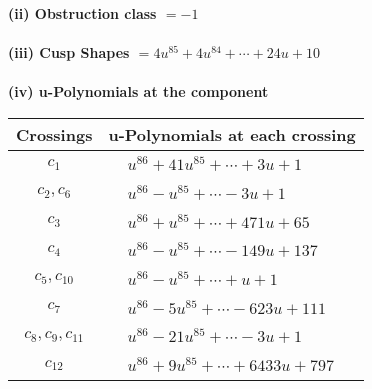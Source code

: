 \documentclass[1p]{elsarticle_modified}
\theoremstyle{definition}
\begin{document}
\flushleft \textbf{(ii) Obstruction class $= -1$}\\~\\
\flushleft \textbf{(iii) Cusp Shapes $= 4 u^{85}+4 u^{84}+\cdots+24 u+10$}\\~\\
\newpage\renewcommand{\arraystretch}{1}
\flushleft \textbf{(iv) u-Polynomials at the component}\newline \\
\begin{tabular}{m{50pt}|m{274pt}}
Crossings & \hspace{64pt}u-Polynomials at each crossing \\
\hline $$\begin{aligned}c_{1}\end{aligned}$$&$\begin{aligned}
&u^{86}+41 u^{85}+\cdots+3 u+1
\end{aligned}$\\
\hline $$\begin{aligned}c_{2},c_{6}\end{aligned}$$&$\begin{aligned}
&u^{86}- u^{85}+\cdots-3 u+1
\end{aligned}$\\
\hline $$\begin{aligned}c_{3}\end{aligned}$$&$\begin{aligned}
&u^{86}+u^{85}+\cdots+471 u+65
\end{aligned}$\\
\hline $$\begin{aligned}c_{4}\end{aligned}$$&$\begin{aligned}
&u^{86}- u^{85}+\cdots-149 u+137
\end{aligned}$\\
\hline $$\begin{aligned}c_{5},c_{10}\end{aligned}$$&$\begin{aligned}
&u^{86}- u^{85}+\cdots+u+1
\end{aligned}$\\
\hline $$\begin{aligned}c_{7}\end{aligned}$$&$\begin{aligned}
&u^{86}-5 u^{85}+\cdots-623 u+111
\end{aligned}$\\
\hline $$\begin{aligned}c_{8},c_{9},c_{11}\end{aligned}$$&$\begin{aligned}
&u^{86}-21 u^{85}+\cdots-3 u+1
\end{aligned}$\\
\hline $$\begin{aligned}c_{12}\end{aligned}$$&$\begin{aligned}
&u^{86}+9 u^{85}+\cdots+6433 u+797
\end{aligned}$\\
\hline
\end{tabular}\\~\\
\end{document}
